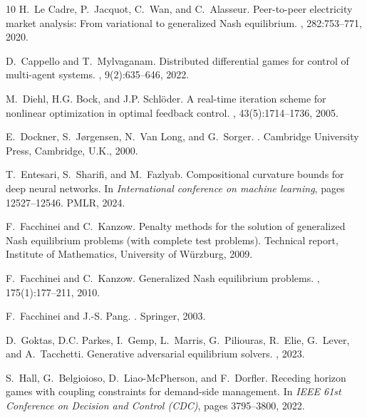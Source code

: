 \documentclass[11pt, a4paper]{article}
\theoremstyle{remark}
\theoremstyle{plain}
\begin{document}
\begin{thebibliography}{10}
H.~Le Cadre, P.~Jacquot, C.~Wan, and C.~Alasseur.
\newblock Peer-to-peer electricity market analysis: From variational to generalized {N}ash equilibrium.
, 282:753--771, 2020.

D.~Cappello and T.~Mylvaganam.
\newblock Distributed differential games for control of multi-agent systems.
, 9(2):635--646, 2022.

M.~Diehl, H.G. Bock, and J.P. Schl{\"o}der.
\newblock A real-time iteration scheme for nonlinear optimization in optimal feedback control.
, 43(5):1714--1736, 2005.

E.~Dockner, S.~J{\o}rgensen, N.~Van Long, and G.~Sorger.
.
\newblock Cambridge University Press, Cambridge, U.K., 2000.

T.~Entesari, S.~Sharifi, and M.~Fazlyab.
\newblock Compositional curvature bounds for deep neural networks.
\newblock In {\em International conference on machine learning}, pages 12527--12546. PMLR, 2024.

F.~Facchinei and C.~Kanzow.
\newblock Penalty methods for the solution of generalized {Nash} equilibrium problems (with complete test problems).
\newblock Technical report, Institute of Mathematics, University of W{\"u}rzburg, 2009.

F.~Facchinei and C.~Kanzow.
\newblock Generalized {N}ash equilibrium problems.
, 175(1):177--211, 2010.

F.~Facchinei and J.-S. Pang.
.
\newblock Springer, 2003.

D.~Goktas, D.C. Parkes, I.~Gemp, L.~Marris, G.~Piliouras, R.~Elie, G.~Lever, and A.~Tacchetti.
\newblock Generative adversarial equilibrium solvers.
, 2023.

S.~Hall, G.~Belgioioso, D.~Liao-McPherson, and F.~Dorfler.
\newblock Receding horizon games with coupling constraints for demand-side management.
\newblock In {\em IEEE 61st Conference on Decision and Control (CDC)}, pages 3795--3800, 2022.


\end{thebibliography}
\end{document}
